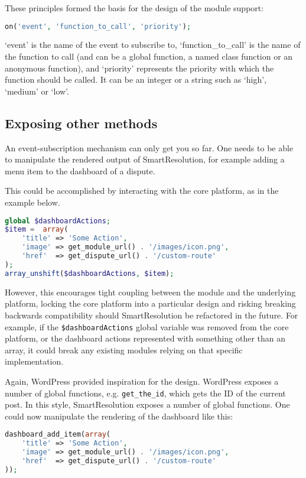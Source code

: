 These principles formed the basis for the design of the module support:

\begin{lstlisting}[language=php]
on('event', 'function_to_call', 'priority');
\end{lstlisting}

`event' is the name of the event to subscribe to, `function\_to\_call' is the name of the function to call (and can be a global function, a named class function or an anonymous function), and `priority' represents the priority with which the function should be called. It can be an integer or a string such as `high', `medium' or `low'.

\subsection{Exposing other methods}

An event-subscription mechanism can only get you so far. One needs to be able to manipulate the rendered output of SmartResolution, for example adding a menu item to the dashboard of a dispute.

This could be accomplished by interacting with the core platform, as in the example below.

\begin{lstlisting}[language=php]
global $dashboardActions;
$item =  array(
    'title' => 'Some Action',
    'image' => get_module_url() . '/images/icon.png',
    'href'  => get_dispute_url() . '/custom-route'
);
array_unshift($dashboardActions, $item);
\end{lstlisting}

However, this encourages tight coupling between the module and the underlying platform, locking the core platform into a particular design and risking breaking backwards compatibility should SmartResolution be refactored in the future. For example, if the \lstinline{$dashboardActions} global variable was removed from the core platform, or the dashboard actions represented with something other than an array, it could break any existing modules relying on that specific implementation.

Again, WordPress provided inspiration for the design. WordPress exposes a number of global functions, e.g. \lstinline{get_the_id}, which gets the ID of the current post. In this style, SmartResolution exposes a number of global functions. One could now manipulate the rendering of the dashboard like this:

\begin{lstlisting}[language=php]
dashboard_add_item(array(
    'title' => 'Some Action',
    'image' => get_module_url() . '/images/icon.png',
    'href'  => get_dispute_url() . '/custom-route'
));
\end{lstlisting}


